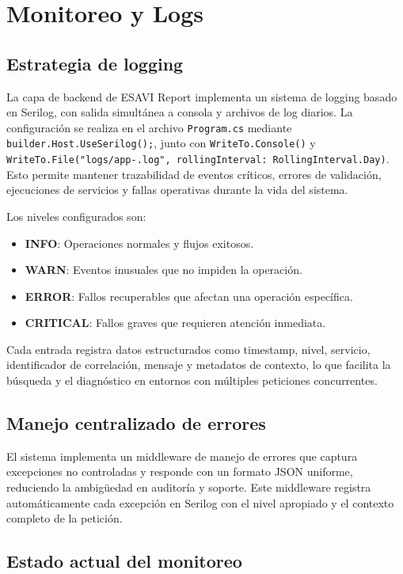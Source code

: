 \documentclass[12pt,letterpaper]{article}
\begin{document}
	\section{Monitoreo y Logs}

\subsection{Estrategia de logging}

La capa de backend de ESAVI Report implementa un sistema de logging basado en Serilog, con salida simultánea a consola y archivos de log diarios. La configuración se realiza en el archivo \texttt{Program.cs} mediante \texttt{builder.Host.UseSerilog();}, junto con \texttt{WriteTo.Console()} y \texttt{WriteTo.File("logs/app-.log", rollingInterval: RollingInterval.Day)}. Esto permite mantener trazabilidad de eventos críticos, errores de validación, ejecuciones de servicios y fallas operativas durante la vida del sistema.

Los niveles configurados son:

\begin{itemize}
    \item \textbf{INFO}: Operaciones normales y flujos exitosos.
    \item \textbf{WARN}: Eventos inusuales que no impiden la operación.
    \item \textbf{ERROR}: Fallos recuperables que afectan una operación específica.
    \item \textbf{CRITICAL}: Fallos graves que requieren atención inmediata.
\end{itemize}

Cada entrada registra datos estructurados como timestamp, nivel, servicio, identificador de correlación, mensaje y metadatos de contexto, lo que facilita la búsqueda y el diagnóstico en entornos con múltiples peticiones concurrentes.

\subsection{Manejo centralizado de errores}

El sistema implementa un middleware de manejo de errores que captura excepciones no controladas y responde con un formato JSON uniforme, reduciendo la ambigüedad en auditoría y soporte. Este middleware registra automáticamente cada excepción en Serilog con el nivel apropiado y el contexto completo de la petición.

\subsection{Estado actual del monitoreo}
\end{document}
